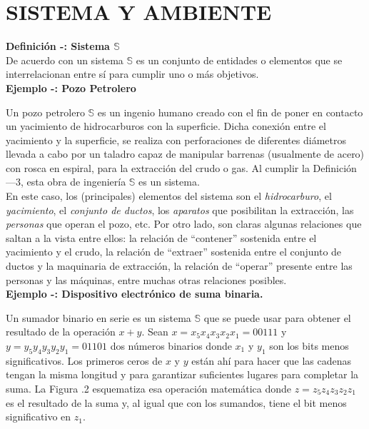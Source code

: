 \section{SISTEMA Y AMBIENTE}\label{sec:sistAmbiente}
\textbf{Definición -: Sistema $\mathbb{S}$}\\

De acuerdo con \cite{klir2006uncertainityInfoTheory} un sistema $\mathbb{S}$ es un conjunto de entidades o elementos que se interrelacionan entre sí para cumplir uno o más objetivos.\\

\textbf{Ejemplo -: Pozo Petrolero}\\


Un pozo petrolero $\mathbb{S}$ es un ingenio humano creado con el fin de poner en contacto un yacimiento de hidrocarburos con la superficie. Dicha conexión entre el yacimiento y la superficie, se realiza con perforaciones de diferentes diámetros llevada a cabo por un taladro capaz de manipular barrenas (usualmente de acero) con rosca en espiral, para la extracción del crudo o gas. Al cumplir la Definición —3, esta obra de ingeniería $\mathbb{S}$ es un sistema.\\

En este caso, los (principales) elementos del sistema son el \textit{hidrocarburo}, el \textit{yacimiento}, el \textit{conjunto de ductos}, los \textit{aparatos} que posibilitan la extracción, las \textit{personas} que operan el pozo, etc. Por otro lado, son claras algunas relaciones que saltan a la vista entre ellos: la relación de “contener” sostenida entre el yacimiento y el crudo, la relación de “extraer” sostenida entre el conjunto de ductos y la maquinaria de extracción, la relación de “operar” presente entre las personas y las máquinas, entre muchas otras relaciones posibles.\\

\textbf{Ejemplo -: Dispositivo electrónico de suma binaria.}\\


Un sumador binario en serie es un sistema $\mathbb{S}$ que se puede usar para obtener el resultado de la operación $x+y$. Sean $x=x_5x_4x_3x_2x_1 = 00111$ y $y=y_5y_4y_3y_2y_1 = 01101$ dos números binarios donde $x_1$ y $y_1$ son los bits menos significativos. Los primeros ceros de $x$ y $y$ están ahí para hacer que las cadenas tengan la misma longitud y para garantizar suficientes lugares para completar la suma. La Figura .2 esquematiza esa operación matemática donde $z=z_5z_4z_3z_2z_1 $ es el resultado de la suma y, al igual que con los sumandos, tiene el bit menos significativo en $z_1$.\\

